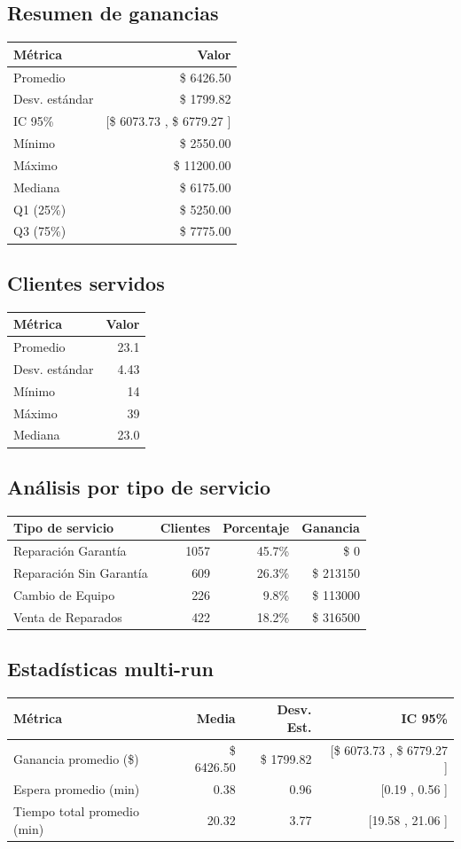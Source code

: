\documentclass[12pt]{article}
\begin{document}
\subsection{Resumen de ganancias}
\begin{tabular}{lr}
\toprule
Métrica & Valor \\
\midrule
Promedio & \$ 6426.50 \\
Desv. estándar & \$ 1799.82 \\
IC 95\% & [\$ 6073.73 , \$ 6779.27 ] \\
Mínimo & \$ 2550.00 \\
Máximo & \$ 11200.00 \\
Mediana & \$ 6175.00 \\
Q1 (25\%) & \$ 5250.00 \\
Q3 (75\%) & \$ 7775.00 \\
\bottomrule
\end{tabular}

\subsection{Clientes servidos}
\begin{tabular}{lr}
\toprule
Métrica & Valor \\
\midrule
Promedio & 23.1 \\
Desv. estándar & 4.43 \\
Mínimo & 14 \\
Máximo & 39 \\
Mediana & 23.0 \\
\bottomrule
\end{tabular}

\subsection{Análisis por tipo de servicio}
\begin{tabular}{lrrr}
\toprule
Tipo de servicio & Clientes & Porcentaje & Ganancia \\
\midrule
Reparación Garantía & 1057 & 45.7\% & \$ 0 \\
Reparación Sin Garantía & 609 & 26.3\% & \$ 213150 \\
Cambio de Equipo & 226 & 9.8\% & \$ 113000 \\
Venta de Reparados & 422 & 18.2\% & \$ 316500 \\
\bottomrule
\end{tabular}

\subsection{Estadísticas multi-run}
\begin{tabular}{lrrr}
\toprule
Métrica & Media & Desv. Est. & IC 95\% \\
\midrule
Ganancia promedio (\$) & \$ 6426.50 & \$ 1799.82 & [\$ 6073.73 , \$ 6779.27 ] \\
Espera promedio (min) & 0.38 & 0.96 & [0.19 , 0.56 ] \\
Tiempo total promedio (min) & 20.32 & 3.77 & [19.58 , 21.06 ] \\
\bottomrule
\end{tabular}
\end{document}
